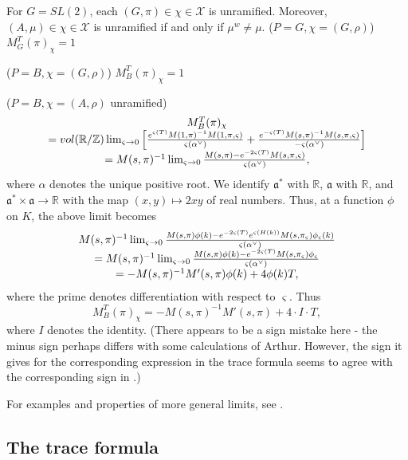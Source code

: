 \begin{example}\label{ex:5.28} For $G=SL(2)$, each $(G,\pi)\in\chi\in{\mathcal{X}}$ is
unramified. Moreover, $(A,\mu)\in\chi\in{\mathcal{X}}$ is unramified
if and only if $\mu^w\not=\mu$.
($P=G,\chi =(G,\rho )$) $M_G^T(\pi )_\chi =1$

($P=B,\chi =(G,\rho )$) $M_B^T(\pi )_\chi =1$

($P=B,\chi =(A,\rho )$ unramified) 
\[
\begin{array}{c}
M_B^T(\pi )_\chi \\
=vol({\mathbb{R}}/{\mathbb{Z}})
\lim_{\varsigma \rightarrow 0}
\left[
\frac{e^{\varsigma (T)}
M(1,\pi )^{-1}M(1,\pi ,\varsigma )}{\varsigma (\alpha^{\vee })}
+\frac{e^{-\varsigma (T)}
M(s,\pi )^{-1}M(s,\pi ,\varsigma )}{-\varsigma (\alpha^{\vee })}
\right]\\
=M(s,\pi)^{-1}
\lim_{\varsigma \rightarrow 0}
{M(s,\pi)-e^{-2\varsigma (T)}M(s,\pi,\varsigma)
\over \varsigma(\alpha^\vee)} ,
\end{array}
\]
where $\alpha $ denotes the unique positive root.
We identify ${\mathfrak{a}}^*$ with ${\mathbb{R}}$, ${\mathfrak{a}}$ with
${\mathbb{R}}$, and
${\mathfrak{a}}^*\times {\mathfrak{a}}\rightarrow {\mathbb{R}}$ with
the map $(x,y)\longmapsto 2xy$
of real numbers. Thus, at a function $\phi$
on $K$, the above limit becomes 
\[
\begin{array}{c}
M(s,\pi)^{-1}
\lim_{\varsigma \rightarrow 0}
{M(s,\pi)\phi(k)-e^{-2\varsigma (T)}e^{\varsigma (H(k))}
M(s,\pi_\varsigma)\phi_\varsigma(k)
\over \varsigma(\alpha^\vee)} \\
=M(s,\pi)^{-1}
\lim_{\varsigma \rightarrow 0}
{M(s,\pi)\phi(k)-e^{-2\varsigma (T)}M(s,\pi_\varsigma)\phi_\varsigma
\over \varsigma(\alpha^\vee)} \\
=-M(s,\pi)^{-1}M'(s,\pi)\phi(k)+4 \phi(k) T,
\end{array}
\]
where the prime denotes differentiation with respect to
$\varsigma$. Thus
\[
M_B^T(\pi )_\chi =
-M(s,\pi)^{-1}M'(s,\pi)+4\cdot I\cdot T,
\]
where $I$ denotes the identity. (There appears to be a sign
mistake here - the minus sign perhaps differs with some
calculations of Arthur. However, the sign it gives for the
corresponding expression in the trace formula
seems to agree with the corresponding sign in \cite{LL}.)

For
examples and properties of more general limits, see \cite[section 6]{A6}.
\end{example}


\subsection{The trace formula}

